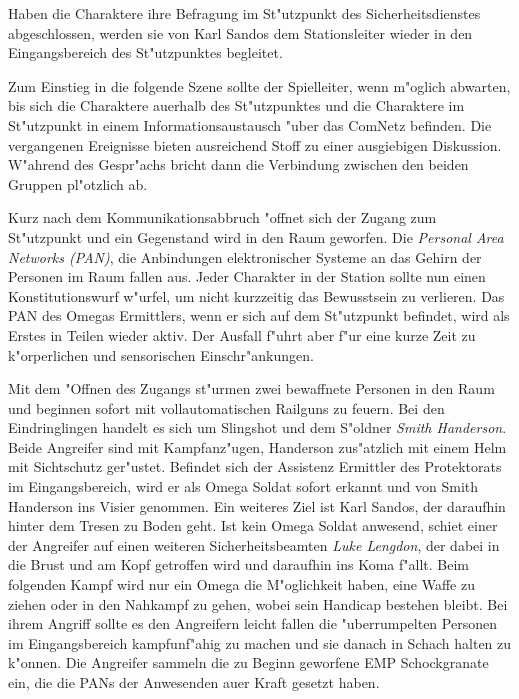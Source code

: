 
Haben die Charaktere ihre Befragung im St"utzpunkt des Sicherheitsdienstes abgeschlossen, werden sie von Karl Sandos dem Stationsleiter wieder in den Eingangsbereich des St"utzpunktes begleitet. 

Zum Einstieg in die folgende Szene sollte der Spielleiter, wenn m"oglich abwarten, bis sich die Charaktere au\3erhalb des St"utzpunktes und die Charaktere im St"utzpunkt in einem Informationsaustausch "uber das ComNetz befinden. Die vergangenen Ereignisse bieten ausreichend Stoff zu einer ausgiebigen Diskussion. W"ahrend des Gespr"achs bricht dann die Verbindung zwischen den beiden Gruppen pl"otzlich ab. 



Kurz nach dem Kommunikationsabbruch "offnet sich der Zugang zum St"utzpunkt und ein Gegenstand wird in den Raum geworfen. Die \emph{Personal Area Networks (PAN)}, die Anbindungen elektronischer Systeme an das Gehirn der Personen im Raum fallen aus. Jeder Charakter in der Station sollte nun einen Konstitutionswurf w"urfel, um nicht kurzzeitig das Bewusstsein zu verlieren. Das PAN des Omegas Ermittlers, wenn er sich auf dem St"utzpunkt befindet, wird als Erstes in Teilen wieder aktiv. Der Ausfall f"uhrt aber f"ur eine kurze Zeit zu k"orperlichen und sensorischen Einschr"ankungen.

Mit dem "Offnen des Zugangs st"urmen zwei bewaffnete Personen in den Raum und beginnen sofort mit vollautomatischen Railguns zu feuern. Bei den Eindringlingen handelt es sich um Slingshot und dem S"oldner \emph{Smith Handerson}. Beide Angreifer sind mit Kampfanz"ugen, Handerson zus"atzlich mit einem Helm mit Sichtschutz ger"ustet. Befindet sich der Assistenz Ermittler des Protektorats im Eingangsbereich, wird er als Omega Soldat sofort erkannt und von Smith Handerson ins Visier genommen. Ein weiteres Ziel ist Karl Sandos, der daraufhin hinter dem Tresen zu Boden geht. Ist kein Omega Soldat anwesend, schie\3t einer der Angreifer auf einen weiteren Sicherheitsbeamten \emph{Luke Lengdon}, der dabei in die Brust und am Kopf getroffen wird und daraufhin ins Koma f"allt. Beim folgenden Kampf wird nur ein Omega die M"oglichkeit haben, eine Waffe zu ziehen oder in den Nahkampf zu gehen, wobei sein Handicap bestehen bleibt. Bei ihrem Angriff sollte es den Angreifern leicht fallen die "uberrumpelten Personen im Eingangsbereich kampfunf"ahig zu machen und sie danach in Schach halten zu k"onnen. Die Angreifer sammeln die zu Beginn geworfene EMP Schockgranate ein, die die PANs der Anwesenden au\3er Kraft gesetzt haben.

